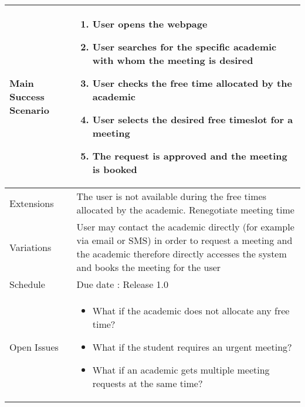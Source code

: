 \documentclass[11pt, a4paper]{article}
\begin{document}
\begin{table}[]
\begin{tabular}{|p{3cm}| p{10.5cm} |}
				\hline
				Main Success Scenario& \begin{enumerate}
					\item User opens the webpage
					\item User searches for the specific academic with whom the meeting is desired
					\item User checks the free time allocated by the academic
					\item User selects the desired free timeslot for a meeting
					\item The request is approved and the meeting is booked
					\end{enumerate}\\
					\hline
					Extensions & The user is not available during the free times allocated by the academic. Renegotiate meeting time\\
					\hline
					Variations & User may contact the academic directly (for example via email or SMS) in order to request a meeting and the academic therefore directly accesses the system and books the meeting for the user\\
					\hline
					Schedule &  Due date : Release 1.0\\
					\hline
					Open Issues &  \begin{itemize}
						\item What if the academic does not allocate any free time?
						\item What if the student requires an urgent meeting?
						\item What if an academic gets multiple meeting requests at the same time? 
						\end{itemize}\\
						\hline
						\end{tabular}
						\end{table}			
\end{document}
